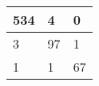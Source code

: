 \begin{tabular}{lll}
\hline
  534 & 4 & 0 \\
\hline
  3 & 97 & 1 \\
\hline
  1 & 1 & 67 \\
\hline
\end{tabular}
